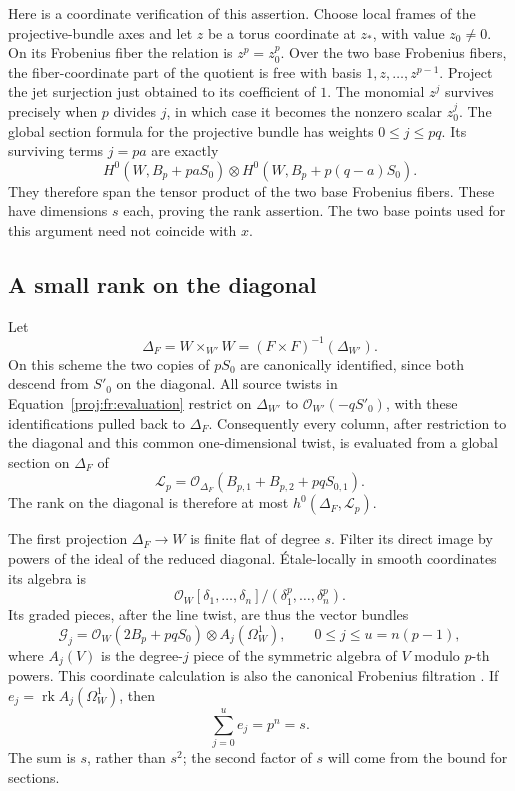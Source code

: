 \documentclass[11pt,letterpaper]{article}
\newcommand{\OO}{\mathcal{O}}
\DeclareMathOperator{\rk}{rk}
\theoremstyle{definition}
\theoremstyle{remark}
\begin{document}
Here is a coordinate verification of this assertion. Choose local
frames of the projective-bundle axes and let \(z\) be a torus coordinate
at \(z_*\), with value \(z_0\ne0\). On its Frobenius fiber the relation
is \(z^p=z_0^p\). Over the two base Frobenius fibers, the fiber-coordinate
part of the quotient is free with basis \(1,z,\ldots,z^{p-1}\).
Project the jet surjection just obtained to its coefficient of \(1\).
The monomial \(z^j\) survives precisely when \(p\) divides \(j\), in
which case it becomes the nonzero scalar \(z_0^j\).
The global section formula for the projective bundle has weights
\(0\leq j\leq pq\). Its surviving terms \(j=pa\) are exactly
\[
 H^0(W,B_p+paS_0)\otimes
 H^0(W,B_p+p(q-a)S_0).
\]
They therefore span the tensor product of the two base Frobenius
fibers. These have dimensions \(s\) each, proving the rank assertion.
The two base points used for this argument need not coincide with \(x\).

\subsection{A small rank on the diagonal}

Let
\[
 \Delta_F=W\times_{W'}W=(F\times F)^{-1}(\Delta_{W'}).
\]
On this scheme the two copies of \(pS_0\) are canonically identified,
since both descend from \(S'_0\) on the diagonal. All source twists
in Equation~\eqref{proj:fr:evaluation} restrict on \(\Delta_{W'}\) to
\(\OO_{W'}(-qS'_0)\), with these identifications pulled back to
\(\Delta_F\). Consequently every column, after restriction to
the diagonal and this common one-dimensional twist, is evaluated from a
global section on \(\Delta_F\) of
\[
 \mathcal L_p=
 \OO_{\Delta_F}(B_{p,1}+B_{p,2}+pqS_{0,1}).
\]
The rank on the diagonal is therefore at most
\(h^0(\Delta_F,\mathcal L_p)\).

The first projection \(\Delta_F\to W\) is finite flat of degree \(s\).
Filter its direct image by powers of the ideal of the reduced
diagonal. \'{E}tale-locally in smooth coordinates its algebra is
\[
 \OO_W[\delta_1,\ldots,\delta_n]/
                  (\delta_1^p,\ldots,\delta_n^p).
\]
Its graded pieces, after the line twist, are thus the vector bundles
\begin{equation}
\label{proj:fr:graded-pieces}
 \mathcal G_j=
 \OO_W(2B_p+pqS_0)\otimes A_j(\Omega_W^1),
 \qquad 0\leq j\leq u=n(p-1),
\end{equation}
where \(A_j(V)\) is the degree-\(j\) piece of the symmetric algebra of
\(V\) modulo \(p\)-th powers. This coordinate calculation is also the
canonical Frobenius filtration
\cite[Theorem~3.7]{Proj-Sun2008}. If \(e_j=\rk A_j(\Omega_W^1)\), then
\begin{equation}
\label{proj:fr:ranks}
 \sum_{j=0}^u e_j=p^n=s.
\end{equation}
The sum is \(s\), rather than \(s^2\); the second factor of \(s\) will
come from the bound for sections.
\end{document}
